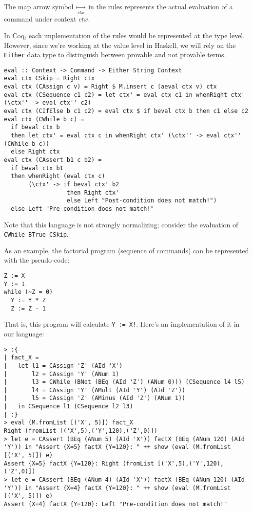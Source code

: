 \documentclass{article}
\begin{document}
The map arrow symbol $\underset{ctx}{\mapsto}$ in the rules represents the actual evaluation of a command under context $ctx$.

In Coq, each implementation of the rules would be represented at the type level. However, since we're working at the value level in Haskell, we will rely on the \texttt{Either} data type to distinguish between provable and not provable terms.

\begin{lstlisting}
eval :: Context -> Command -> Either String Context
eval ctx CSkip = Right ctx
eval ctx (CAssign c v) = Right $ M.insert c (aeval ctx v) ctx
eval ctx (CSequence c1 c2) = let ctx' = eval ctx c1 in whenRight ctx' (\ctx'' -> eval ctx'' c2)
eval ctx (CIfElse b c1 c2) = eval ctx $ if beval ctx b then c1 else c2
eval ctx (CWhile b c) =
  if beval ctx b
  then let ctx' = eval ctx c in whenRight ctx' (\ctx'' -> eval ctx'' (CWhile b c))
  else Right ctx
eval ctx (CAssert b1 c b2) =
  if beval ctx b1
  then whenRight (eval ctx c)
       (\ctx' -> if beval ctx' b2
                  then Right ctx'
                  else Left "Post-condition does not match!")
  else Left "Pre-condition does not match!"
\end{lstlisting}

Note that this language is not strongly normalizing; consider the evaluation of \texttt{CWhile BTrue CSkip}.

As an example, the factorial program (sequence of commands) can be represented with the pseudo-code:

\begin{lstlisting}
Z := X
Y := 1
while (~Z = 0)
  Y := Y * Z
  Z := Z - 1
\end{lstlisting}

That is, this program will calculate \texttt{Y := X!}. Here's an implementation of it in our language:

\begin{lstlisting}
> :{
| fact_X =
|   let l1 = CAssign 'Z' (AId 'X')
|       l2 = CAssign 'Y' (ANum 1)
|       l3 = CWhile (BNot (BEq (AId 'Z') (ANum 0))) (CSequence l4 l5)
|       l4 = CAssign 'Y' (AMult (AId 'Y') (AId 'Z'))
|       l5 = CAssign 'Z' (AMinus (AId 'Z') (ANum 1))
|   in CSequence l1 (CSequence l2 l3)
| :}
> eval (M.fromList [('X', 5)]) fact_X
Right (fromList [('X',5),('Y',120),('Z',0)])
> let e = CAssert (BEq (ANum 5) (AId 'X')) factX (BEq (ANum 120) (AId 'Y')) in "Assert {X=5} factX {Y=120}: " ++ show (eval (M.fromList [('X', 5)]) e)
Assert {X=5} factX {Y=120}: Right (fromList [('X',5),('Y',120),('Z',0)])
> let e = CAssert (BEq (ANum 4) (AId 'X')) factX (BEq (ANum 120) (AId 'Y')) in "Assert {X=4} factX {Y=120}: " ++ show (eval (M.fromList [('X', 5)]) e)
Assert {X=4} factX {Y=120}: Left "Pre-condition does not match!"
\end{lstlisting}
\end{document}
